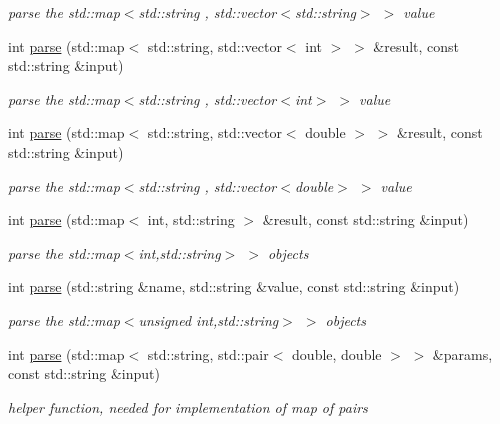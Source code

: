\begin{DoxyCompactItemize}
\begin{DoxyCompactList}\small\item\em parse the {\ttfamily std\+::map$<$std\+::string , std\+::vector$<$std\+::string$>$ $>$} value \end{DoxyCompactList}\item 
int \hyperlink{namespace_d_d4hep_1_1_parsers_a0da3b1bf74df4603de3860725652b1f7}{parse} (std\+::map$<$ std\+::string, std\+::vector$<$ int $>$ $>$ \&result, const std\+::string \&input)
\begin{DoxyCompactList}\small\item\em parse the {\ttfamily std\+::map$<$std\+::string , std\+::vector$<$int$>$ $>$} value \end{DoxyCompactList}\item 
int \hyperlink{namespace_d_d4hep_1_1_parsers_a117aacde08a7caa18db156f5871ad9cf}{parse} (std\+::map$<$ std\+::string, std\+::vector$<$ double $>$ $>$ \&result, const std\+::string \&input)
\begin{DoxyCompactList}\small\item\em parse the {\ttfamily std\+::map$<$std\+::string , std\+::vector$<$double$>$ $>$} value \end{DoxyCompactList}\item 
int \hyperlink{namespace_d_d4hep_1_1_parsers_a3d922ac85001241814312a94a6ccdbc3}{parse} (std\+::map$<$ int, std\+::string $>$ \&result, const std\+::string \&input)
\begin{DoxyCompactList}\small\item\em parse the {\ttfamily std\+::map$<$int,std\+::string$>$ $>$} objects \end{DoxyCompactList}\item 
int \hyperlink{namespace_d_d4hep_1_1_parsers_a62f00a034a77a322187e7cd94418f696}{parse} (std\+::string \&name, std\+::string \&value, const std\+::string \&input)
\begin{DoxyCompactList}\small\item\em parse the {\ttfamily std\+::map$<$unsigned int,std\+::string$>$ $>$} objects \end{DoxyCompactList}\item 
int \hyperlink{namespace_d_d4hep_1_1_parsers_a2af85c2e9ae2c5ec0e91d3e992d529c2}{parse} (std\+::map$<$ std\+::string, std\+::pair$<$ double, double $>$ $>$ \&params, const std\+::string \&input)
\begin{DoxyCompactList}\small\item\em helper function, needed for implementation of map of pairs \end{DoxyCompactList}\item 

\end{DoxyCompactItemize}
